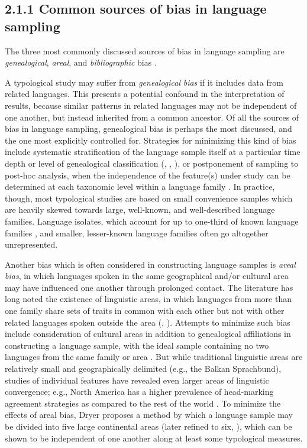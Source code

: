\subsection{2.1.1 Common sources of bias in language sampling}

  The three most commonly discussed sources of bias in language sampling are \textit{genealogical}, \textit{areal}, and \textit{bibliographic} bias \citep{Bakker2011}. 

  A typological study may suffer from \textit{genealogical} \textit{bias} if it includes data from related languages. This presents a potential confound in the interpretation of results, because similar patterns in related languages may not be independent of one another, but instead inherited from a common ancestor. Of all the sources of bias in language sampling, genealogical bias is perhaps the most discussed, and the one most explicitly controlled for. Strategies for minimizing this kind of bias include systematic stratification of the language sample itself at a particular time depth or level of genealogical classification (\citealt{Bell1978b}, \citealt{Maddieson1984}, \citealt{Dryer1989}), or postponement of sampling to post-hoc analysis, when the independence of the feature(s) under study can be determined at each taxonomic level within a language family \citep{Bickel2008}. In practice, though, most typological studies are based on small convenience samples which are heavily skewed towards large, well-known, and well-described language families. Language isolates, which account for up to one-third of known language families \citep{Campbell2016}, and smaller, lesser-known language families often go altogether unrepresented.

  Another bias which is often considered in constructing language samples is \textit{areal} \textit{bias}, in which languages spoken in the same geographical and/or cultural area may have influenced one another through prolonged contact. The literature has long noted the existence of linguistic areas, in which languages from more than one family share sets of traits in common with each other but not with other related languages spoken outside the area (\citealt{AikhenvaldDixon2001a}, \citealt{Chirikba2008}). Attempts to minimize such bias include consideration of cultural areas in addition to genealogical affiliations in constructing a language sample, with the ideal sample containing no two languages from the same family or area \citep{Perkins1985}. But while traditional linguistic areas are relatively small and geographically delimited (e.g., the Balkan Sprachbund), studies of individual features have revealed even larger areas of linguistic convergence; e.g., North America has a higher prevalence of head-marking agreement strategies as compared to the rest of the world \citep{Dryer1989}. To minimize the effects of areal bias, Dryer proposes a method by which a language sample may be divided into five large continental areas (later refined to six, \citealt{Dryer1992}), which can be shown to be independent of one another along at least some typological measures.


